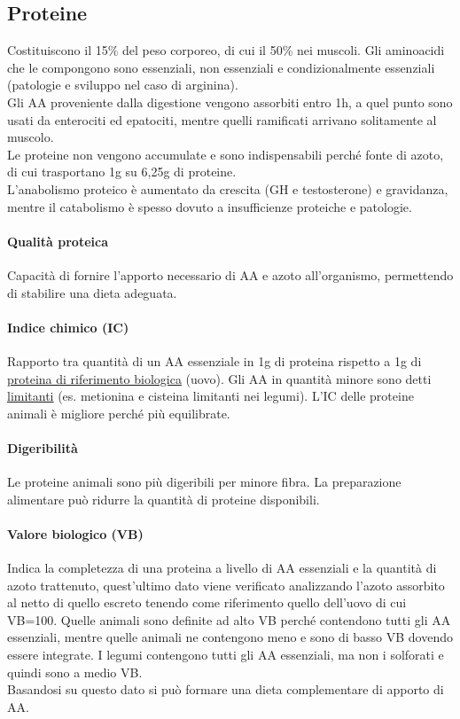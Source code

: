 \documentclass[10pt]{article}
\begin{document}
\subsection{Proteine}
Costituiscono il 15\% del peso corporeo, di cui il 50\% nei muscoli. Gli aminoacidi che le compongono sono essenziali, non essenziali e condizionalmente essenziali (patologie e sviluppo nel caso di arginina).\\
Gli AA proveniente dalla digestione vengono assorbiti entro 1h, a quel punto sono usati da enterociti ed epatociti, mentre quelli ramificati arrivano solitamente al muscolo.\\
Le proteine non vengono accumulate e sono indispensabili perché fonte di azoto, di cui trasportano 1g su 6,25g di proteine. \\
L'anabolismo proteico è aumentato da crescita (GH e testosterone) e gravidanza, mentre il catabolismo è spesso dovuto a insufficienze proteiche e patologie.
\paragraph*{Qualità proteica} Capacità di fornire l'apporto necessario di AA e azoto all'organismo, permettendo di stabilire una dieta adeguata.
\paragraph*{Indice chimico (IC)} Rapporto tra quantità di un AA essenziale in 1g di proteina rispetto a 1g di \underline{proteina di riferimento biologica} (uovo). Gli AA in quantità minore sono detti \underline{limitanti} (es. metionina e cisteina limitanti nei legumi). L'IC delle proteine animali è migliore perché più equilibrate.
\paragraph*{Digeribilità} Le proteine animali sono più digeribili per minore fibra. La preparazione alimentare può ridurre la quantità di proteine disponibili.
\paragraph*{Valore biologico (VB)} Indica la completezza di una proteina a livello di AA essenziali e la quantità di azoto trattenuto, quest'ultimo dato viene verificato analizzando l'azoto assorbito al netto di quello escreto tenendo come riferimento quello dell'uovo di cui VB=100. Quelle animali sono definite ad alto VB perché contendono tutti gli AA essenziali, mentre quelle animali ne contengono meno e sono di basso VB dovendo essere integrate. I legumi contengono tutti gli AA essenziali, ma non i solforati e quindi sono a medio VB.\\
Basandosi su questo dato si può formare una dieta complementare di apporto di AA.
\end{document}

